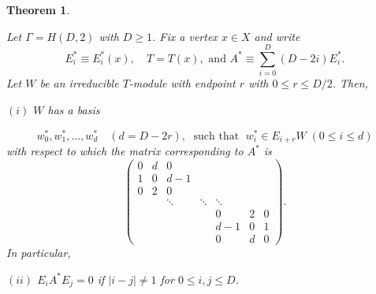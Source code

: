 \documentclass[
]{book}
\newtheorem{theorem}{Theorem}[chapter]
\theoremstyle{definition}
\theoremstyle{definition}
\theoremstyle{definition}
\theoremstyle{definition}
\theoremstyle{remark}
\begin{document}
\begin{theorem}
\protect\hypertarget{thm:hd2-modules2}{}\label{thm:hd2-modules2}

Let \(\Gamma = H(D,2)\) with \(D\geq 1\). Fix a vertex \(x\in X\) and write
\[E^*_i \equiv E^*_i(x), \quad T = T(x), \text{ and } A^* \equiv \sum_{i=0}^D(D-2i)E^*_i.\]
Let \(W\) be an irreducible \(T\)-module with endpoint \(r\) with \(0\leq r\leq D/2\). Then,

\((i)\) \(W\) has a basis

\[w_0^*, w_1^*, \ldots, w_d^* \quad(d = D-2r), \; \text{ such that }\; w_i^*\in E_{i+r}W\; (0\leq i \leq d)\]
with respect to which the matrix corresponding to \(A^*\) is
\[\begin{pmatrix} 
0 & d & 0   &  & & &  \\
1 & 0 & d-1 &  & & & \\
0 & 2 & 0   &  & & & \\
  &   & \ddots    & \ddots & \ddots &  & \\
  &   &                   & & 0 & 2 & 0 \\
  &   &      & & d-1 & 0 & 1\\
  &   &      & & 0 & d & 0
\end{pmatrix}.\]
In particular,

\((ii)\) \(E_iA^*E_j = 0\) if \(|i-j|\neq 1\) for \(0 \leq i, j\leq D\).

\end{theorem}
\end{document}
